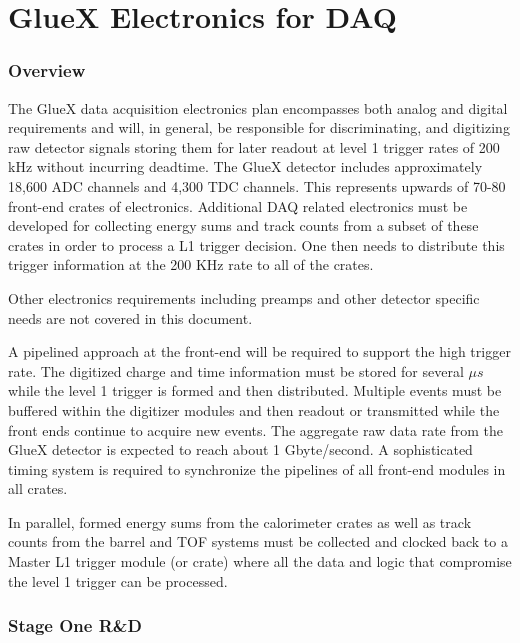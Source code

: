 \documentclass[10pt]{article}
\begin{document}
\section*{GlueX Electronics for DAQ}


\subsubsection*{Overview}

The GlueX data acquisition electronics plan encompasses both analog and digital requirements 
and will, in general, be responsible for discriminating, and digitizing raw detector signals
storing them for later readout at level 1 trigger rates of 200 kHz without incurring deadtime. 
The GlueX detector includes approximately 18,600 ADC channels and 4,300 TDC channels. This
represents upwards of 70-80 front-end crates of electronics. Additional DAQ related electronics 
must be developed for collecting energy sums and track counts from a subset of these crates in 
order to process a L1 trigger decision. One then needs to distribute this trigger information at
the 200 KHz rate to all of the crates. 

Other electronics requirements including preamps and other detector specific needs are not covered
in this document.

A pipelined approach at the front-end will be required to support the high trigger rate.  The
digitized charge and time information must be stored for several $ \mu s $ while the
level 1 trigger is formed and then distributed.  Multiple events must be buffered within
the digitizer modules and then readout or transmitted while the front ends continue to
acquire new events.  The aggregate raw data rate from the GlueX detector is expected to
reach  about 1 Gbyte/second. A sophisticated timing system is required to synchronize the
pipelines of all front-end modules in all crates. 

In parallel, formed energy sums from the calorimeter crates as well as track counts from the 
barrel and TOF systems must be collected and clocked back to a Master L1 trigger module (or crate) 
where all the data and logic that compromise the level 1 trigger can be processed.


\subsubsection*{Stage One R\&D}
\end{document}
